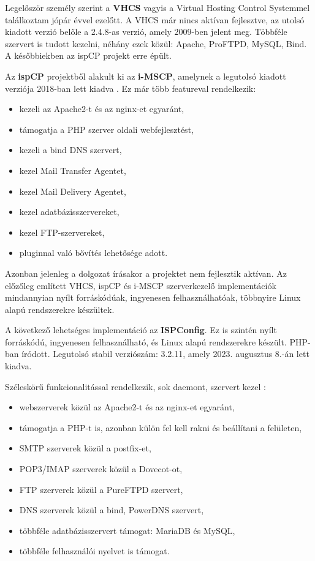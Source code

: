 Legelőször személy szerint a \textbf{VHCS} vagyis a Virtual Hosting Control Systemmel találkoztam jópár évvel ezelőtt. A VHCS már nincs aktívan fejlesztve, az utolsó kiadott verzió belőle a 2.4.8-as verzió, amely 2009-ben jelent meg. \cite{vhcs} Többféle szervert is tudott kezelni, néhány ezek közül: Apache, ProFTPD, MySQL, Bind. A későbbiekben az ispCP projekt erre épült. \cite{ispcp} 

Az \textbf{ispCP} projektből alakult ki az \textbf{i-MSCP}, amelynek a legutolsó kiadott verziója 2018-ban lett kiadva \cite{imscp}. Ez már több featureval rendelkezik:
\begin{itemize}
	\item kezeli az Apache2-t és az nginx-et egyaránt,
	\item támogatja a PHP szerver oldali webfejlesztést,
	\item kezeli a bind DNS szervert,
	\item kezel Mail Transfer Agentet,
	\item kezel Mail Delivery Agentet,
	\item kezel adatbázisszervereket,
	\item kezel FTP-szervereket,
	\item pluginnal való bővítés lehetősége adott.
\end{itemize}
Azonban jelenleg a dolgozat írásakor a projektet nem fejlesztik aktívan. Az előzőleg említett VHCS, ispCP és i-MSCP szerverkezelő implementációk mindannyian nyílt forráskódúak, ingyenesen felhasználhatóak, többnyire Linux alapú rendszerekre készültek.

A következő lehetséges implementáció az \textbf{ISPConfig}. Ez is szintén nyílt forráskódú, ingyenesen felhasználható, és Linux alapú rendszerekre készült. PHP-ban íródott. Legutolsó stabil verziószám: 3.2.11, amely 2023. augusztus 8.-án lett kiadva. \cite{ispconfig}

Széleskörű funkcionalitással rendelkezik, sok daemont, szervert kezel \cite{ispconfig2}:
\begin{itemize}
	\item webszerverek közül az Apache2-t és az nginx-et egyaránt,
	\item támogatja a PHP-t is, azonban külön fel kell rakni és beállítani a felületen,
	\item SMTP szerverek közül a postfix-et,
	\item POP3/IMAP szerverek közül a Dovecot-ot,
	\item FTP szerverek közül a PureFTPD szervert,
	\item DNS szerverek közül a bind, PowerDNS szervert,
	\item többféle adatbázisszervert támogat: MariaDB és MySQL,
	\item többféle felhasználói nyelvet is támogat.
\end{itemize}

